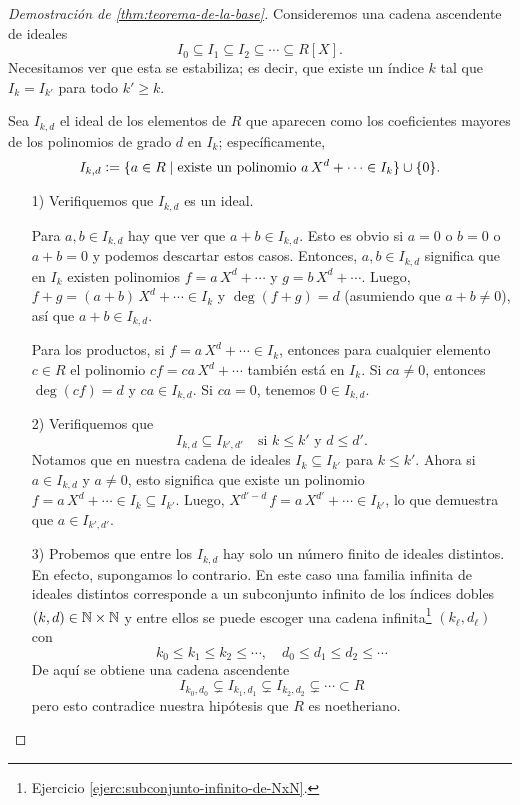 \begin{proof}[Demostración de \ref{thm:teorema-de-la-base}]
  Consideremos una cadena ascendente de ideales
  $$I_0 \subseteq I_1 \subseteq I_2 \subseteq \cdots \subseteq R [X].$$
  Necesitamos ver que esta se estabiliza; es decir, que existe un índice $k$ tal
  que $I_k = I_{k'}$ para todo $k' \ge k$.

  \vspace{1em}

  Sea $I_{k,d}$ el ideal de los elementos de $R$ que aparecen como
  los coeficientes mayores de los polinomios de grado $d$ en $I_k$;
  específicamente,
  \[ I_{k,d} \mathrel{\mathop:}= \{ a\in R\mid\text{existe un polinomio }a\,X^d +\cdots\in I_k \}
            \cup \{ 0 \}. \]

  \begin{enumerate}
  \item[1)] Verifiquemos que $I_{k,d}$ es un ideal.

    Para $a,b \in I_{k,d}$ hay que ver que $a + b \in I_{k,d}$. Esto es obvio
    si $a = 0$ o $b = 0$ o $a + b = 0$ y podemos descartar estos
    casos. Entonces, $a,b \in I_{k,d}$ significa que en $I_k$ existen polinomios
    $f = a\,X^d + \cdots$ y $g = b\,X^d + \cdots$. Luego,
    $f+g = (a+b)\,X^d + \cdots \in I_k$ y $\deg (f+g) = d$ (asumiendo que
    $a+b \ne 0$), así que $a+b \in I_{k,d}$.

    Para los productos, si $f = a\,X^d + \cdots \in I_k$, entonces para
    cualquier elemento $c\in R$ el polinomio $cf = ca\,X^d + \cdots$ también
    está en $I_k$. Si $ca \ne 0$, entonces $\deg (cf) = d$ y $ca \in
    I_{k,d}$. Si $ca = 0$, tenemos $0 \in I_{k,d}$.

  \item[2)] Verifiquemos que
    $$I_{k,d} \subseteq I_{k',d'} \quad\text{si }k\le k'\text{ y }d\le d'.$$
    Notamos que en nuestra cadena de ideales $I_k \subseteq I_{k'}$ para
    $k \le k'$. Ahora si $a \in I_{k,d}$ y $a \ne 0$, esto significa que existe
    un polinomio $f = a\,X^d + \cdots \in I_k \subseteq I_{k'}$. Luego,
    $X^{d'-d}\,f = a\,X^{d'} + \cdots \in I_{k'}$, lo que demuestra que
    $a \in I_{k',d'}$.

  \item[3)] Probemos que entre los $I_{k,d}$ hay solo un número finito
    de ideales distintos. En efecto, supongamos lo contrario. En este caso una
    familia infinita de ideales distintos corresponde a un subconjunto infinito
    de los índices dobles $(k,d)\in \mathbb{N}\times \mathbb{N}$ y entre ellos se puede
    escoger una cadena infinita\footnote{Ejercicio
      \ref{ejerc:subconjunto-infinito-de-NxN}.} $(k_\ell,d_\ell)$ con
    $$k_0 \le k_1 \le k_2 \le \cdots, \quad d_0 \le d_1 \le d_2 \le \cdots$$
    De aquí se obtiene una cadena ascendente
    \[ I_{k_0,d_0} \subsetneq I_{k_1,d_1} \subsetneq
       I_{k_2,d_2} \subsetneq \cdots \subset R \]
    pero esto contradice nuestra hipótesis que $R$ es noetheriano.


\end{enumerate}
\end{proof}
